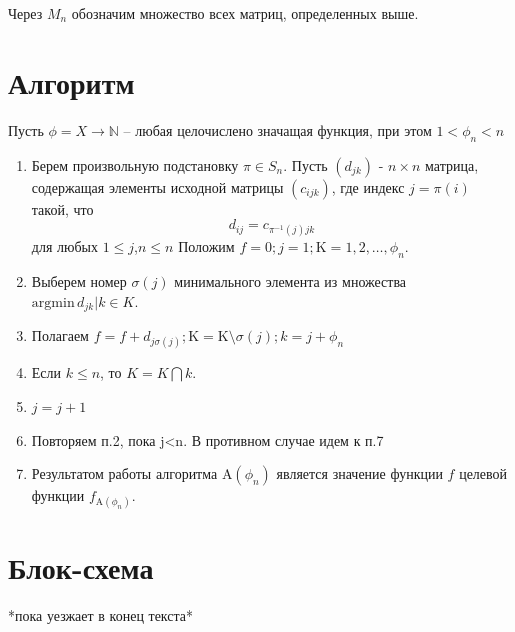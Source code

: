 Через $M_n$ обозначим множество всех матриц, определенных выше. 

\section{Алгоритм}
Пусть $\phi = X \rightarrow \mathbb{N}$ -- любая целочислено значащая функция, при этом $1 < \phi_n < n$ 
\begin{enumerate}
\item Берем произвольную подстановку $\pi \in S_n$. Пусть $(d_{jk})$ - $n \times n$ 
матрица, содержащая элементы исходной матрицы $(c_{ijk})$, где индекс $j=\pi(i)$ такой, что
$$
d_{ij} = c_{\pi^{-1}(j)jk}
$$
для любых $1 \leq j$,$n \leq n$
Положим $f = 0 ; j =1 ; \mathrm{K}={1,2, \ldots , \phi_n}$. 
\item Выберем номер $\sigma(j)$ минимального элемента из множества $\mathrm{argmin} \, {d_{jk} | k \in K}$.
\item Полагаем $f = f + d_{j \sigma (j)} ; \mathrm{K} = \mathrm{K}  \setminus  {\sigma(j)} ; k=j+\phi_n$
\item Если $k \leq n $, то $K = K \bigcap {k}$.
\item $j = j + 1$
\item Повторяем п.2, пока j<n. В противном случае идем к п.7
\item Результатом работы алгоритма $\mathrm{A}(\phi_n)$ является значение функции $f$ целевой функции   
$f_{\mathrm{A}(\phi_n)}$. 
\end{enumerate}
\section{Блок-схема}
*пока уезжает в конец текста*

